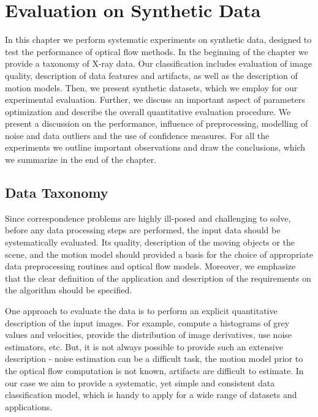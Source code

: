 \chapter {Evaluation on Synthetic Data}
\label{experiments}

In this chapter we perform  systematic experiments on synthetic data, designed to test the performance of optical flow methods.  In the beginning of the chapter we provide a taxonomy of X-ray data. Our classification includes evaluation of image quality, description of data features and artifacts, as well as the description of motion models. Then, we present synthetic datasets, which we employ for our experimental evaluation. Further, we discuss an important aspect of parameters optimization and describe the overall quantitative evaluation procedure.  We present a discussion on the performance, influence of preprocessing, modelling of noise and data outliers and the use of confidence measures. For all the experiments we outline important observations and draw the conclusions, which we summarize in the end of the chapter.


\section{Data Taxonomy}
\label{data_taxonomy}


Since correspondence problems are highly ill-posed and challenging to solve, before any data processing steps are performed, the input data should be systematically evaluated. Its quality, description of the moving objects or the scene, and the motion model should provided a basis for the choice of appropriate data preprocessing routines and optical flow models. Moreover, we emphasize that the clear definition of the application and description of the requirements on the algorithm should be specified. 

One approach to evaluate the data is to perform an explicit quantitative description of the input images. For example, compute a histograms of grey values and velocities, provide the distribution of image derivatives, use noise estimators, etc.
But, it is not always possible to provide such an extensive description - noise estimation can be a difficult task, the motion model prior to the optical flow computation is not known, artifacts are difficult to estimate. In our case we aim to provide a systematic, yet simple and consistent data classification model, which is handy to apply for a wide range of datasets and applications.

